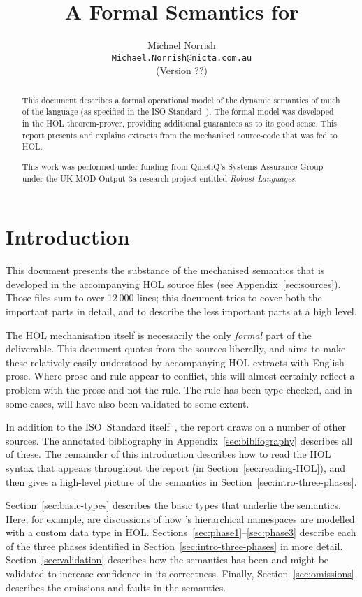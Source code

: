 \documentclass[11pt]{article}
\title{A Formal Semantics for \cpp}
\author{Michael Norrish\\{\small \texttt{Michael.Norrish@nicta.com.au}}\\
{\footnotesize (Version ??)}}
\date{}
\begin{document}
\maketitle
\begin{abstract}
  This document describes a formal operational model of the dynamic
  semantics of much of the \cpp{} language (as specified in the ISO
  Standard~\cite{cpp-standard-iso14882}).  The formal model was
  developed in the HOL theorem-prover, providing additional guarantees
  as to its good sense.  This report presents and explains extracts
  from the mechanised source-code that was fed to HOL.

  This work was performed under funding from QinetiQ's Systems
  Assurance Group under the UK MOD Output 3a research project entitled
  \emph{Robust Languages}.
\end{abstract}

\tableofcontents
\listoffigures

\section{Introduction}

This document presents the substance of the mechanised \cpp{}
semantics that is developed in the accompanying HOL source files (see
Appendix~\ref{sec:sources}).  Those files sum to over 12$\,$000 lines;
this document tries to cover both the important parts in detail, and
to describe the less important parts at a high level.

The HOL mechanisation itself is necessarily the only \emph{formal}
part of the deliverable.  This document quotes from the sources
liberally, and aims to make these relatively easily understood by
accompanying HOL extracts with English prose.  Where prose and rule
appear to conflict, this will almost certainly reflect a problem with
the prose and not the rule.  The rule has been type-checked, and in
some cases, will have also been validated to some extent.

In addition to the ISO~Standard itself~\cite{cpp-standard-iso14882},
the report draws on a number of other sources.  The annotated
bibliography in Appendix~\ref{sec:bibliography} describes all of
these.  The remainder of this introduction describes how to read the
HOL syntax that appears throughout the report (in
Section~\ref{sec:reading-HOL}), and then gives a high-level picture of
the \cpp{} semantics in Section~\ref{sec:intro-three-phases}.

Section~\ref{sec:basic-types} describes the basic types that underlie
the semantics.  Here, for example, are discussions of how \cpp{}'s
hierarchical namespaces are modelled with a custom data type in
HOL. Sections~\ref{sec:phase1}--\ref{sec:phase3} describe each of the
three phases identified in Section~\ref{sec:intro-three-phases} in
more detail.  Section~\ref{sec:validation} describes how the semantics
has been and might be validated to increase confidence in its
correctness.  Finally, Section~\ref{sec:omissions} describes the
omissions and faults in the semantics.
\end{document}

